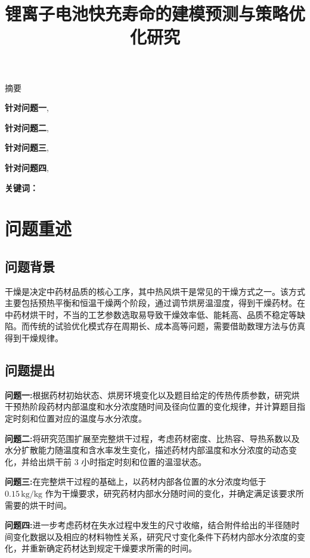 \documentclass[withoutpreface]{cumcmthesis}
\title{锂离子电池快充寿命的建模预测与策略优化研究}
\begin{document}





\maketitle
\begin{center}
    {\heiti{} 摘\quad 要}
\end{center}


\textbf{针对问题一},

\textbf{针对问题二},

\textbf{针对问题三},

\textbf{针对问题四},

\noindent\textbf{关键词：}


\clearpage

\section{问题重述}
\subsection{问题背景}
干燥是决定中药材品质的核心工序，其中热风烘干是常见的干燥方式之一。该方式主要包括预热平衡和恒温干燥两个阶段，通过调节烘房温湿度，得到干燥药材。在中药材烘干时，不当的工艺参数选取易导致干燥效率低、能耗高、品质不稳定等缺陷。而传统的试验优化模式存在周期长、成本高等问题，需要借助数理方法与仿真得到干燥规律。
\subsection{问题提出}
\textbf{问题一:}根据药材初始状态、烘房环境变化以及题目给定的传热传质参数，研究烘干预热阶段药材内部温度和水分浓度随时间及径向位置的变化规律，并计算题目指定时刻和位置对应的温度与水分浓度。

\textbf{问题二:}将研究范围扩展至完整烘干过程，考虑药材密度、比热容、导热系数以及水分扩散能力随温度和含水率发生变化，描述药材内部温度和水分浓度的动态变化，并给出烘干前 3 小时指定时刻和位置的温湿状态。

\textbf{问题三:}在完整烘干过程的基础上，以药材内部各位置的水分浓度均低于 \(0.15\,\mathrm{kg/kg}\) 作为干燥要求，研究药材内部水分随时间的变化，并确定满足该要求所需要的烘干时间。

\textbf{问题四:}进一步考虑药材在失水过程中发生的尺寸收缩，结合附件给出的半径随时间变化数据以及相应的材料物性关系，研究尺寸变化条件下药材内部水分浓度的变化，并重新确定药材达到规定干燥要求所需的时间。
\end{document}
